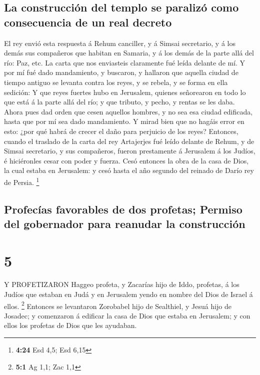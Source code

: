 \hypertarget{la-construcciuxf3n-del-templo-se-paralizuxf3-como-consecuencia-de-un-real-decreto}{%
\subsection{La construcción del templo se paralizó como consecuencia de
un real
decreto}\label{la-construcciuxf3n-del-templo-se-paralizuxf3-como-consecuencia-de-un-real-decreto}}

 El rey envió esta respuesta á Rehum canciller, y á Simsai
secretario, y á los demás sus compañeros que habitan en Samaria, y á los
demás de la parte allá del río: Paz, etc.  La carta que nos
enviasteis claramente fué leída delante de mí.  Y por mí
fué dado mandamiento, y buscaron, y hallaron que aquella ciudad de
tiempo antiguo se levanta contra los reyes, y se rebela, y se forma en
ella sedición:  Y que reyes fuertes hubo en Jerusalem,
quienes señorearon en todo lo que está á la parte allá del río; y que
tributo, y pecho, y rentas se les daba.  Ahora pues dad
orden que cesen aquellos hombres, y no sea esa ciudad edificada, hasta
que por mí sea dado mandamiento.  Y mirad bien que no
hagáis error en esto: ¿por qué habrá de crecer el daño para perjuicio de
los reyes?  Entonces, cuando el traslado de la carta del
rey Artajerjes fué leído delante de Rehum, y de Simsai secretario, y sus
compañeros, fueron prestamente á Jerusalem á los Judíos, é hiciéronles
cesar con poder y fuerza.  Cesó entonces la obra de la casa
de Dios, la cual estaba en Jerusalem: y cesó hasta el año segundo del
reinado de Darío rey de Persia. \footnote{\textbf{4:24} Esd 4,5; Esd
  6,15}

\hypertarget{profecuxedas-favorables-de-dos-profetas-permiso-del-gobernador-para-reanudar-la-construcciuxf3n}{%
\subsection{Profecías favorables de dos profetas; Permiso del gobernador
para reanudar la
construcción}\label{profecuxedas-favorables-de-dos-profetas-permiso-del-gobernador-para-reanudar-la-construcciuxf3n}}

\hypertarget{section-4}{%
\section{5}\label{section-4}}

 Y PROFETIZARON Haggeo profeta, y Zacarías hijo de Iddo,
profetas, á los Judíos que estaban en Judá y en Jerusalem yendo en
nombre del Dios de Israel á ellos. \footnote{\textbf{5:1} Ag 1,1; Zac
  1,1}  Entonces se levantaron Zorobabel hijo de Sealthiel,
y Jesuá hijo de Josadec; y comenzaron á edificar la casa de Dios que
estaba en Jerusalem; y con ellos los profetas de Dios que les ayudaban.

